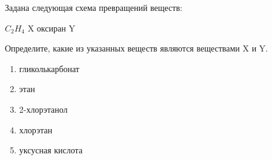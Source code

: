 Задана следующая схема превращений веществ:

$C_2H_4$  X  оксиран  Y

Определите, какие из указанных веществ являются веществами X и Y.
\begin{enumerate}
    \item гликолькарбонат
    \item этан
    \item 2-хлорэтанол
    \item хлорэтан
    \item уксусная кислота
\end{enumerate}

